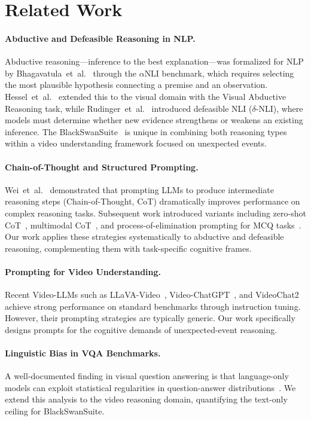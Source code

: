 \section{Related Work}
\label{sec:related}

\paragraph{Abductive and Defeasible Reasoning in NLP.}
Abductive reasoning---inference to the best explanation---was formalized for NLP by Bhagavatula~et~al.~\cite{bhagavatula2020abductive} through the $\alpha$NLI benchmark, which requires selecting the most plausible hypothesis connecting a premise and an observation.
Hessel~et~al.~\cite{hessel2022abduction} extended this to the visual domain with the Visual Abductive Reasoning task, while Rudinger~et~al.~\cite{rudinger2020thinking} introduced defeasible NLI ($\delta$-NLI), where models must determine whether new evidence strengthens or weakens an existing inference.
The BlackSwanSuite~\cite{chinchure2025black} is unique in combining both reasoning types within a video understanding framework focused on unexpected events.

\paragraph{Chain-of-Thought and Structured Prompting.}
Wei~et~al.~\cite{wei2022chain} demonstrated that prompting LLMs to produce intermediate reasoning steps (Chain-of-Thought, CoT) dramatically improves performance on complex reasoning tasks.
Subsequent work introduced variants including zero-shot CoT~\cite{kojima2022large}, multimodal CoT~\cite{zhang2023multimodal}, and process-of-elimination prompting for MCQ tasks~\cite{ma2023lets}.
Our work applies these strategies systematically to abductive and defeasible reasoning, complementing them with task-specific cognitive frames.

\paragraph{Prompting for Video Understanding.}
Recent Video-LLMs such as LLaVA-Video~\cite{zhang2024video}, Video-ChatGPT~\cite{maaz2024videochatgpt}, and VideoChat2~\cite{li2024mvbench} achieve strong performance on standard benchmarks through instruction tuning.
However, their prompting strategies are typically generic.
Our work specifically designs prompts for the cognitive demands of unexpected-event reasoning.

\paragraph{Linguistic Bias in VQA Benchmarks.}
A well-documented finding in visual question answering is that language-only models can exploit statistical regularities in question-answer distributions~\cite{agrawal2018dont,goyal2017making}.
We extend this analysis to the video reasoning domain, quantifying the text-only ceiling for BlackSwanSuite.
